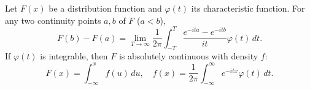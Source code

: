 Let $F(x)$ be a distribution function and $\varphi(t)$ its characteristic function. For any two continuity points $a, b$ of $F$ ($a < b$),
$$F(b) - F(a) = \lim_{T \to \infty} \frac{1}{2\pi} \int_{-T}^{T} \frac{e^{-ita} - e^{-itb}}{it} \varphi(t) \, dt.$$
If $\varphi(t)$ is integrable, then $F$ is absolutely continuous with density $f$:
$$F(x) = \int_{-\infty}^{x} f(u) \, du, \quad f(x) = \frac{1}{2\pi} \int_{-\infty}^{\infty} e^{-itx} \varphi(t) \, dt.$$
